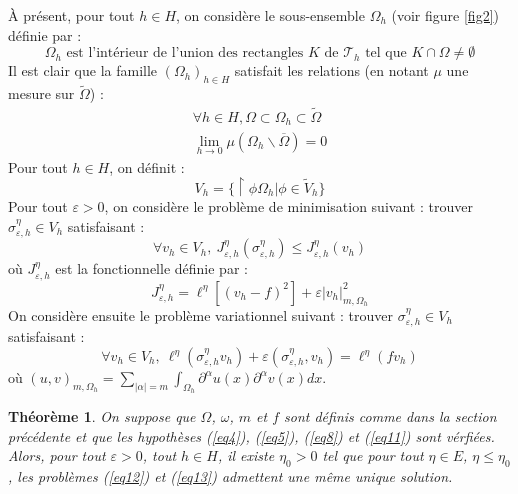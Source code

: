 \documentclass{article}
\newtheorem{theorem}{Théorème}[subsection]
\begin{document}
\bigskip
À présent, pour tout $h\in H$, on considère le sous-ensemble $\Omega_h$ (voir figure \ref{fig2}) définie par :
	\begin{equation} \label{eq8} \Omega_h \text{ est l'intérieur de l'union des rectangles } K \text{ de } \mathscr{T}_h \text{ tel que } K\cap\Omega\neq\emptyset \end{equation}
Il est clair que la famille $(\Omega_h)_{h\in H}$ satisfait les relations (en notant $\mu$ une mesure sur $\tilde{\Omega}$) :
\begin{eqnarray}
	\label{eq9} \forall h\in H, \Omega\subset\Omega_h\subset\tilde{\Omega}\\
	\label{eq10} \lim_{h\to 0} \mu(\Omega_h\backslash\overline{\Omega})=0
\end{eqnarray}
Pour tout $h\in H$, on définit :
	\begin{equation}\label{eq11} V_h=\{\restriction{\phi}{\Omega_h}| \phi\in\tilde{V}_h\}\end{equation}
Pour tout $\varepsilon>0$, on considère le problème de minimisation suivant : trouver $\sigma_{\varepsilon,h}^\eta\in V_h$ satisfaisant :
	\begin{equation} \label{eq12} \forall v_h\in V_h,\ J_{\varepsilon, h}^\eta (\sigma_{\varepsilon, h}^\eta)\leq J_{\varepsilon, h}^\eta (v_h) \end{equation}
où $J_{\varepsilon, h}^\eta$ est la fonctionnelle définie par :
	\[J_{\varepsilon, h}^\eta=\ell^\eta \left[(v_h-f)^2\right]+\varepsilon |v_h|^2_{m,\Omega_h}\]
On considère ensuite le problème variationnel suivant : trouver $\sigma_{\varepsilon,h}^\eta\in V_h$ satisfaisant :
	\begin{equation} \label{eq13} \forall v_h\in V_h,\ \ell^\eta (\sigma_{\varepsilon, h}^\eta v_h)+ \varepsilon \left(\sigma_{\varepsilon, h}^\eta,v_h\right)=\ell^\eta(fv_h) \end{equation}
où $(u,v)_{m,\Omega_h}=\sum_{|\alpha|=m} \int_{\Omega_h} \partial^\alpha u(x) \partial^\alpha v(x) dx$.\\

\begin{theorem}
On suppose que $\Omega$, $\omega$, $m$ et $f$ sont définis comme dans la section précédente et que les hypothèses (\ref{eq4}), (\ref{eq5}), (\ref{eq8}) et (\ref{eq11}) sont vérfiées. Alors, pour tout $\varepsilon>0$, tout $h\in H$, il existe $\eta_0>0$ tel que pour tout $\eta\in E$, $\eta\leq\eta_0$, les problèmes (\ref{eq12}) et (\ref{eq13}) admettent une même unique solution.
\end{theorem}
\end{document}
